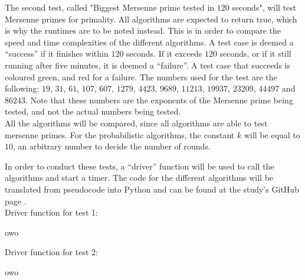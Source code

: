\documentclass[main.tex]{subfiles}
\begin{document}
The second test, called "Biggest Mersenne prime tested in $120$ seconds", will
test Mersenne primes for primality. All algorithms are expected to return true,
which is why the runtimes are to be noted instead. This is in order to compare
the speed and time complexities of the different algorithms. A test case is
deemed a ``success'' if it finishes within $120$ seconds. If it exceeds $120$
seconds, or if it still running after five minutes, it is deemed a ``failure''.
A test case that succeeds is coloured green, and red for a failure. The numbers
used for the test are the following: $19$, $31$, $61$, $107$, $607$, $1279$,
$4423$, $9689$, $11213$, $19937$, $23209$, $44497$ and $86243$. Note that these
numbers are the exponents of the Mersenne prime being tested, and not
the actual numbers being tested. \\

All the algorithms will be compared, since all algorithms are able to test
mersenne primes. For the probabilistic algorithms, the constant $k$ will be
equal to $10$, an arbitrary number to decide the number of rounds. \newline

In order to conduct these tests, a ``driver'' function will be used to call the
algorithms and start a timer. The code for the different algorithms will be
translated from pseudocode into Python and can be found at the study's GitHub
page \cite{github}. \\

Driver function for test 1:

\begin{python}
  owo
\end{python}

\vspace{5mm}

Driver function for test 2:

\begin{python}
  owo
\end{python}
\end{document}
